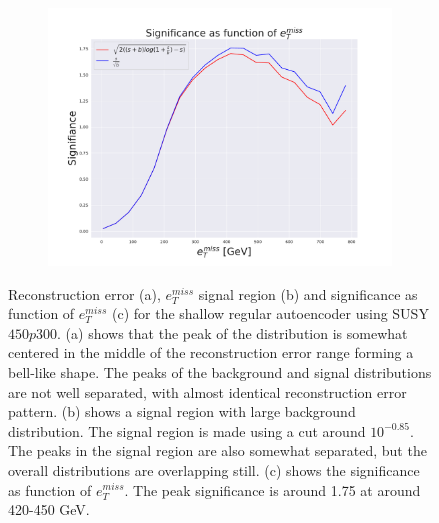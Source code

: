 \begin{figure}[H]
    \hfill  
    \begin{subfigure}{.49\textwidth}
        \includegraphics[width=\textwidth]{Figures/VAE_testing/small/2lep/significance_etmiss_450p0p0300_-0.8484803499636524.pdf}
        \caption{}
        \label{fig:VAE_2lep_small_signi_450}
    \end{subfigure}
    \hfill      
    \caption[2lep shallow network | $450p300$ | VAE]{Reconstruction error (a), $e_T^{miss}$ signal region (b) and significance as function of 
    $e_T^{miss}$ (c) for the shallow regular autoencoder using SUSY $450p300$.
    (a) shows that the peak of the distribution is somewhat centered in the middle 
    of the reconstruction error range forming a bell-like shape. The peaks of the background and signal 
    distributions are not well separated, with almost identical reconstruction error pattern. (b) 
    shows a signal region with large background distribution. The signal region is made using a cut around
    $10^{-0.85}$. The peaks in the signal region are also somewhat 
    separated, but the overall distributions are overlapping still. 
    (c) shows the significance as function of $e_T^{miss}$. 
The peak significance is around 1.75 at around 420-450 GeV.}
    \label{fig:VAE_2lep_small_rec_sig_signi_450}
\end{figure}


